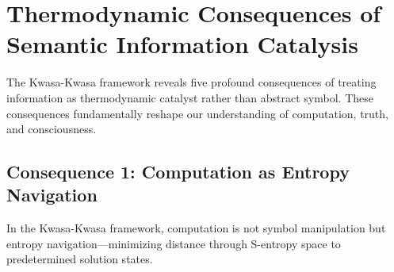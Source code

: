 \section{Thermodynamic Consequences of Semantic Information Catalysis}

The Kwasa-Kwasa framework reveals five profound consequences of treating information as thermodynamic catalyst rather than abstract symbol. These consequences fundamentally reshape our understanding of computation, truth, and consciousness.

\subsection{Consequence 1: Computation as Entropy Navigation}

\begin{theorem}
\label{thm:computation_as_entropy_navigation}
In the Kwasa-Kwasa framework, computation is not symbol manipulation but entropy navigation—minimizing distance through S-entropy space to predetermined solution states.
\end{theorem}

